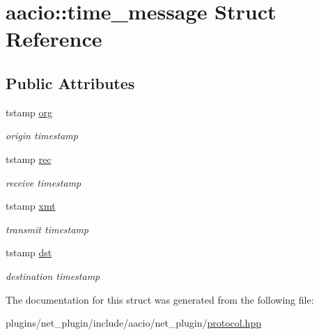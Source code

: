 \hypertarget{structaacio_1_1time__message}{}\section{aacio\+:\+:time\+\_\+message Struct Reference}
\label{structaacio_1_1time__message}
\subsection*{Public Attributes}
\begin{DoxyCompactItemize}
\item 
\mbox{\label{structaacio_1_1time__message_a1d3a81fb33dbd8909a81d3fe3f6783cd}} 
tstamp \mbox{\hyperlink{structaacio_1_1time__message_a1d3a81fb33dbd8909a81d3fe3f6783cd}{org}}
\begin{DoxyCompactList}\small\item\em origin timestamp \end{DoxyCompactList}\item 
\mbox{\label{structaacio_1_1time__message_a5c2ce3dbf912bbf1c93ad6d8da8e0322}} 
tstamp \mbox{\hyperlink{structaacio_1_1time__message_a5c2ce3dbf912bbf1c93ad6d8da8e0322}{rec}}
\begin{DoxyCompactList}\small\item\em receive timestamp \end{DoxyCompactList}\item 
\mbox{\label{structaacio_1_1time__message_abb852a5a4f14541e48ce95177d68ee42}} 
tstamp \mbox{\hyperlink{structaacio_1_1time__message_abb852a5a4f14541e48ce95177d68ee42}{xmt}}
\begin{DoxyCompactList}\small\item\em transmit timestamp \end{DoxyCompactList}\item 
\mbox{\label{structaacio_1_1time__message_a885e85abeece225ec7f87c3eb6f0bafe}} 
tstamp \mbox{\hyperlink{structaacio_1_1time__message_a885e85abeece225ec7f87c3eb6f0bafe}{dst}}
\begin{DoxyCompactList}\small\item\em destination timestamp \end{DoxyCompactList}\end{DoxyCompactItemize}


The documentation for this struct was generated from the following file\+:\begin{DoxyCompactItemize}
\item 
plugins/net\+\_\+plugin/include/aacio/net\+\_\+plugin/\mbox{\hyperlink{plugins_2net__plugin_2include_2aacio_2net__plugin_2protocol_8hpp}{protocol.\+hpp}}\end{DoxyCompactItemize}

